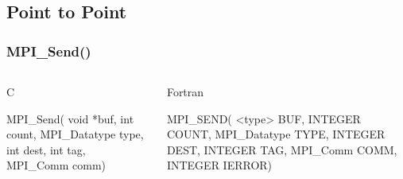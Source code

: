 \documentclass{beamer}
\begin{document}
\subsection{Point to Point}
\begin{frame}[fragile]
 \frametitle{MPI\_Send()}
   \begin{columns}[T]
    \begin{column}{5cm}
     \begin{block}{C}
      \begin{semiverbatim}
MPI\_Send( void  *buf,
           int count,
  MPI\_Datatype  type,
           int  dest,
           int   tag,
      MPI\_Comm   comm)
      \end{semiverbatim}
     \end{block}
    \end{column}
    \begin{column}{5cm}
     \begin{block}{Fortran}
      \begin{semiverbatim}
MPI\_SEND( <type>   BUF,
      INTEGER    COUNT,
 MPI\_Datatype     TYPE,
      INTEGER     DEST,
      INTEGER      TAG,
     MPI\_Comm     COMM,
      INTEGER    IERROR)
      \end{semiverbatim}
     \end{block}
    \end{column}
   \end{columns}
\end{frame}
\end{document}
